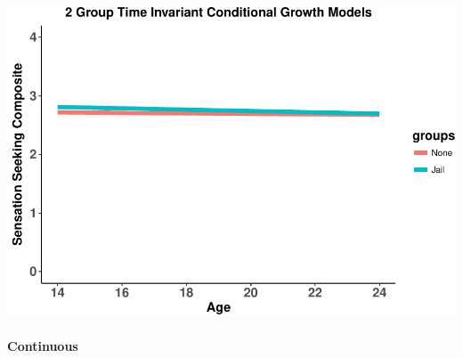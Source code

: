 \documentclass[]{article}
\let\oldparagraph\paragraph
\renewcommand{\paragraph}[1]{\oldparagraph{#1}\mbox{}}
\begin{document}
\includegraphics{Conditional_Models_doc_files/figure-latex/unnamed-chunk-32-1.pdf}

\paragraph{Continuous}\label{continuous-1}
\end{document}
